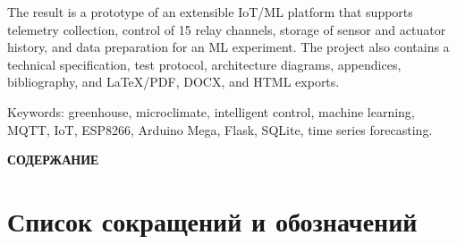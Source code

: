 \documentclass[a4paper,14pt]{extarticle}
\newcommand{\VkrStructuralSectionNoToc}[1]{%
  \begin{center}\bfseries #1\end{center}%
  \par\nopagebreak\vspace{12pt}%
}
\begin{document}
The result is a prototype of an extensible IoT/ML platform that supports
telemetry collection, control of 15 relay channels, storage of sensor
and actuator history, and data preparation for an ML experiment. The
project also contains a technical specification, test protocol,
architecture diagrams, appendices, bibliography, and LaTeX/PDF, DOCX,
and HTML exports.

Keywords: greenhouse, microclimate, intelligent control, machine
learning, MQTT, IoT, ESP8266, Arduino Mega, Flask, SQLite, time series
forecasting.

\clearpage

\VkrStructuralSectionNoToc{СОДЕРЖАНИЕ}
\makeatletter{}\makeatother
\clearpage

\section{Список сокращений и
обозначений}\label{ux441ux43fux438ux441ux43eux43a-ux441ux43eux43aux440ux430ux449ux435ux43dux438ux439-ux438-ux43eux431ux43eux437ux43dux430ux447ux435ux43dux438ux439}
\end{document}
